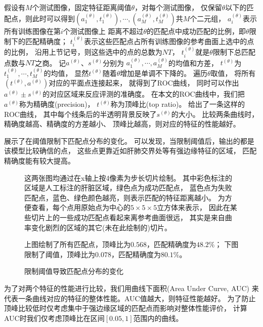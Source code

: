 假设有$M$个测试图像，固定特征距离阈值$\theta$，对每个测试图像，
仅保留$\theta$以下的匹配点，则此时可以得到$(a_1^{(\theta)},
t_1^{(\theta)}),\cdots,(a_M^{(\theta)}, t_M^{(\theta)})$共$M$个二元组，
$a_i^{(\theta)}$表示所有训练图像在第$i$个测试图像上
距离不超过$\theta$的匹配点中成功匹配的比例，即$\theta$限制下的匹配精确度；
$t_i^{(\theta)}$表示这些匹配点占所有训练图像的参考曲面上选中的点的比例，
沿用上节记号，则这些选中的点的总数为$NT$，
$t_i^{(\theta)}$就是$\theta$限制下总匹配点数与$NT$之商。
记$a^{(\theta)}$、$s^{(\theta)}$分别为
$a_1^{(\theta)},\cdots,a_M^{(\theta)}$的均值和方差，
$t^{(\theta)}$为$t_1^{(\theta)},\cdots,t_M^{(\theta)}$的均值，
显然$t^{(\theta)}$随着$\theta$增加是单调不下降的。
遍历$\theta$取值，
将所有$(t^{(\theta)}, a^{(\theta)})$对应的平面点连接起来，
就得到了ROC曲线，
同时可以作出$a^{(\theta)} \pm s^{(\theta)}$的对应区域来反应评测的准确度。
在本文的ROC曲线中，我们把$a^{(\theta)}$称为精确度(precision)，
$t^{(\theta)}$称为顶峰比(top ratio)。
给出了一条这样的ROC曲线，
其中每个线条后的半透明背景反映了$s^{(\theta)}$的大小。
比较两条曲线时，精确度越高、精确度的方差越小、
顶峰比越高，则对应的特征的性能越好。

展示了在阈值限制下匹配点分布的变化。
可以发现，当限制阈值后，输出的都是该模型比较确信的点，
这些点更靠近如肝肺交界处等有强边缘特征的区域，
匹配精确度能有较大提高。

\begin{figure}[H]
    {
        \caption{限制阈值导致匹配点分布的变化}
        \label{fig:expr:match}
    }
    \footnotesize
    这两张图均通过在x轴上按4像素为步长切片绘制。
    其中彩色标注的区域是人工标注的肝脏区域，绿色点为成功匹配点，
    蓝色点为失败匹配点，蓝色、绿色颜色越亮，则表示匹配的特征距离越小。
    为方便查看，每个点用原始点为中心的$5\times 5 \times 5$立方体来表示，
    因此在某些切片上的一些成功匹配点看起来离参考曲面很远，
    其实是来自曲率变化剧烈的区域的其它(未在此绘制的)切片。

    上图绘制了所有匹配点，顶峰比为$0.568$，匹配精确度为$48.2\%$；
    下图限制了阈值，顶峰比为$0.078$，匹配精确度为$80.1\%$。
\end{figure}

为了对两个特征的性能进行比较，我们用曲线下面积(Area Under Curve, AUC)
来代表一条曲线对应的特征的整体性能。AUC值越大，则特征性能越好。
为了防止顶峰比较低时仅考虑集中于强边缘区域的匹配点而影响对整体性能评价，
计算AUC时我们仅考虑顶峰比在区间$[0.05, 1]$范围内的曲线。

